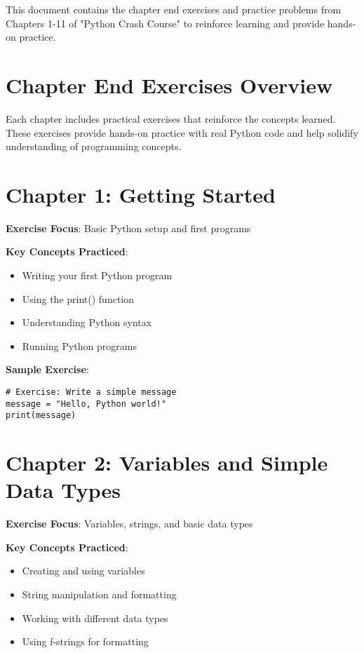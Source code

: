 
This document contains the chapter end exercises and practice problems from Chapters 1-11 of "Python Crash Course" to reinforce learning and provide hands-on practice.

\section*{Chapter End Exercises Overview}
Each chapter includes practical exercises that reinforce the concepts learned. These exercises provide hands-on practice with real Python code and help solidify understanding of programming concepts.

\section*{Chapter 1: Getting Started}
\textbf{Exercise Focus}: Basic Python setup and first programs

\textbf{Key Concepts Practiced}:
\begin{itemize}
    \item Writing your first Python program
    \item Using the print() function
    \item Understanding Python syntax
    \item Running Python programs
\end{itemize}

\textbf{Sample Exercise}:
\begin{lstlisting}
# Exercise: Write a simple message
message = "Hello, Python world!"
print(message)
\end{lstlisting}

\section*{Chapter 2: Variables and Simple Data Types}
\textbf{Exercise Focus}: Variables, strings, and basic data types

\textbf{Key Concepts Practiced}:
\begin{itemize}
    \item Creating and using variables
    \item String manipulation and formatting
    \item Working with different data types
    \item Using f-strings for formatting
\end{itemize}

